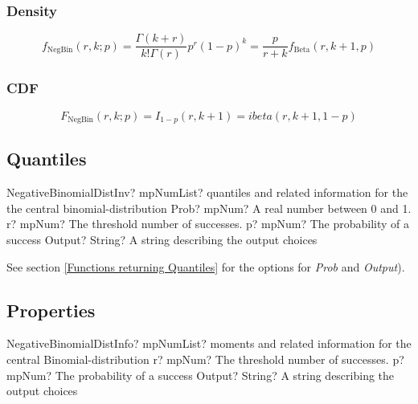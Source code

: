 \subsubsection{Density}
\label{NegativBinomialDistributionDensity}

\begin{equation} 
	f_{\text{NegBin}}(r, k; p) = \frac{\Gamma(k+r)}{k! \Gamma(r)} p^r (1-p)^k = \frac{p}{r+k} f_{\text{Beta}}(r,k+1,p)
\end{equation}


\subsubsection{CDF}
\vspace{0.3cm}
\begin{equation} 
	F_{\text{NegBin}}(r, k; p)= I_{1-p}(r,k+1) = ibeta(r,k+1,1-p)
\end{equation}



\subsection{Quantiles}

\begin{mpFunctionsExtract}
	\mpFunctionFourNotImplemented
	{NegativeBinomialDistInv? mpNumList? quantiles and related information for the the central binomial-distribution}
	{Prob? mpNum? A real number between 0 and 1.}
	{r? mpNum? The threshold number of successes.}
	{p? mpNum? The probability of a success}
	{Output? String? A string describing the output choices}
\end{mpFunctionsExtract}

\vspace{0.3cm}
See section \ref{Functions returning Quantiles} for the options for  {\itshape\sffamily Prob} and {\itshape\sffamily Output}). 



\subsection{Properties}
\label{NegativBinomialDistributionProperties}


\begin{mpFunctionsExtract}
	\mpFunctionThreeNotImplemented
	{NegativeBinomialDistInfo? mpNumList? moments and related information for the central Binomial-distribution}
	{r? mpNum? The threshold number of successes.}
	{p? mpNum? The probability of a success}
	{Output? String? A string describing the output choices}
\end{mpFunctionsExtract}

